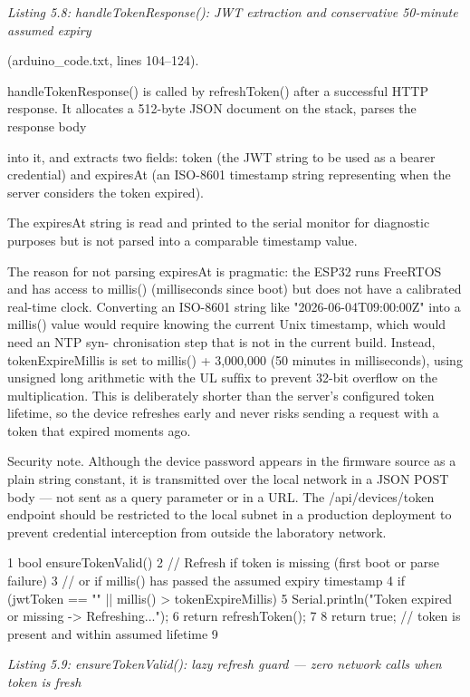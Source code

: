 \textit{Listing 5.8: handleTokenResponse(): JWT extraction and conservative 50-minute assumed expiry}

(arduino\_code.txt, lines 104--124).


handleTokenResponse() is called by refreshToken() after a successful HTTP
response. It allocates a 512-byte JSON document on the stack, parses the response body



into it, and extracts two ﬁelds: token (the JWT string to be used as a bearer credential)
and expiresAt (an ISO-8601 timestamp string representing when the server considers the
token expired).

The expiresAt string is read and printed to the serial monitor for diagnostic purposes
but is not parsed into a comparable timestamp value.

The reason for not parsing expiresAt is pragmatic: the ESP32 runs FreeRTOS and
has access to millis() (milliseconds since boot) but does not have a calibrated real-time
clock. Converting an ISO-8601 string like "2026-06-04T09:00:00Z" into a millis()
value would require knowing the current Unix timestamp, which would need an NTP syn-
chronisation step that is not in the current build. Instead, tokenExpireMillis is set to
millis() + 3,000,000 (50 minutes in milliseconds), using unsigned long arithmetic
with the UL sufﬁx to prevent 32-bit overﬂow on the multiplication. This is deliberately
shorter than the server's conﬁgured token lifetime, so the device refreshes early and never
risks sending a request with a token that expired moments ago.



Security note. Although the device password appears in the ﬁrmware source as a plain
string constant, it is transmitted over the local network in a JSON POST body --- not sent as
a query parameter or in a URL. The /api/devices/token endpoint should be restricted to
the local subnet in a production deployment to prevent credential interception from outside
the laboratory network.

1 bool ensureTokenValid() {
2 // Refresh if token is missing (first boot or parse failure)
3 // or if millis() has passed the assumed expiry timestamp
4 if (jwtToken == "" || millis() > tokenExpireMillis) {
5 Serial.println("Token expired or missing -> Refreshing...");
6 return refreshToken();
7 }
8 return true; // token is present and within assumed lifetime
9 }


\textit{Listing 5.9: ensureTokenValid(): lazy refresh guard --- zero network calls when token is fresh}

